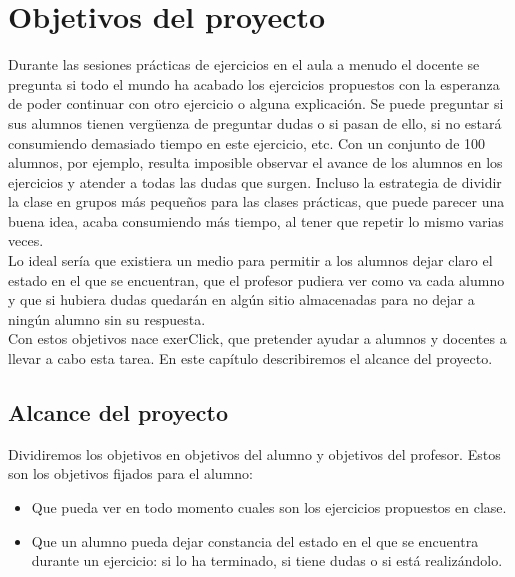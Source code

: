 
\pagestyle{fancy}

\chapter{Objetivos del proyecto}
\label{objetivos}

Durante las sesiones prácticas de ejercicios en el aula a menudo el docente se pregunta si todo el mundo ha acabado los ejercicios propuestos con la esperanza de poder continuar con otro ejercicio o alguna explicación. Se puede preguntar si sus alumnos tienen vergüenza de preguntar dudas o si pasan de ello, si no estará consumiendo demasiado tiempo en este ejercicio, etc. Con un conjunto de 100 alumnos, por ejemplo, resulta imposible observar el avance de los alumnos en los ejercicios y atender a todas las dudas que surgen. Incluso la estrategia de dividir la clase en grupos más pequeños para las clases prácticas, que puede parecer una buena idea, acaba consumiendo más tiempo, al tener que repetir lo mismo varias veces.\\

Lo ideal sería que existiera un medio para permitir a los alumnos dejar claro el estado en el que se encuentran, que el profesor pudiera ver como va cada alumno y que si hubiera dudas quedarán en algún sitio almacenadas para no dejar a ningún alumno sin su respuesta.\\

Con estos objetivos nace exerClick, que pretender ayudar a alumnos y docentes a llevar a cabo esta tarea. En este capítulo describiremos el alcance del proyecto.\\

\section{Alcance del proyecto}

Dividiremos los objetivos en objetivos del alumno y objetivos del profesor. Estos son los objetivos fijados para el alumno:

\begin{itemize}
\item Que pueda ver en todo momento cuales son los ejercicios propuestos en clase.
\item Que un alumno pueda dejar constancia del estado en el que se encuentra durante un ejercicio: si lo ha terminado, si tiene dudas o si está realizándolo.
\end{itemize}

